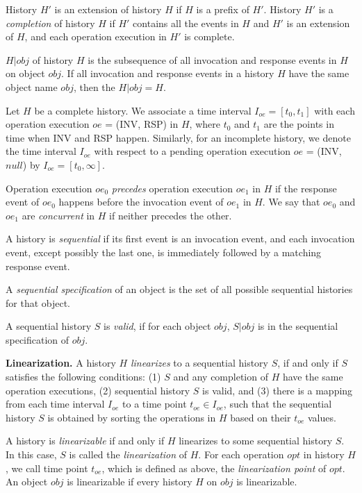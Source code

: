 History $H'$ is an extension of history $H$ if $H$ is a prefix of $H'$.
History $H'$ is a \emph{completion} of history $H$ if $H'$ contains all the
events in $H$ and $H'$ is an extension of $H$, and each operation execution in $H'$ is complete.

$H|obj$ of history $H$ is the subsequence of all
invocation and response events in $H$ on object $obj$. If all invocation and response
events in a history $H$ have the same object name $obj$, then the $H|obj = H$.

Let $H$ be a complete history. We associate a time interval $I_{oe} = [t_0, t_1]$ with each
operation execution $oe$ = (INV, RSP) in $H$, where $t_0$ and $t_1$ are the points in time when INV and RSP happen.
Similarly, for an incomplete history, we denote the time interval $I_{oe}$ with respect to a pending
operation execution $oe$ = (INV, $null$) by $I_{oe} = [t_0, \infty]$.

Operation execution $oe_0$ \emph{precedes} operation execution $oe_1$ in $H$ if the response event of
$oe_0$ happens before the invocation event of $oe_1$ in $H$.
We say that $oe_0$ and $oe_1$ are \emph{concurrent} in $H$ if neither precedes the other.

A history is \emph{sequential} if its first event is an invocation event, and each invocation event, except
possibly the last one, is immediately followed by a matching response event.

A \emph{sequential specification} of an object is the set of all possible sequential histories
for that object.

A sequential history $S$ is \emph{valid}, if for each object $obj$, $S|obj$ is
in the sequential specification of $obj$.

\textbf{Linearization.}
A history $H$ \emph{linearizes} to a sequential history $S$, if and only if $S$ satisfies the
following conditions: (1) $S$ and any completion of $H$ have the same operation executions, (2) sequential history $S$ is
valid, and (3) there is a mapping from each time interval $I_{oe}$ to a time point $t_{oe} \in I_{oe}$, such
that the sequential history $S$ is obtained by sorting the operations in $H$ based on their $t_{oe}$ values.

A history is \emph{linearizable} if and only if $H$ linearizes to some sequential history $S$. In this case,
$S$ is called the \emph{linearization} of $H$. For each operation $opt$ in history $H$, we call time point $t_{oe}$, which is
defined as above, the \emph{linearization point} of $opt$. An object $obj$ is linearizable if every
history $H$ on $obj$ is linearizable.

